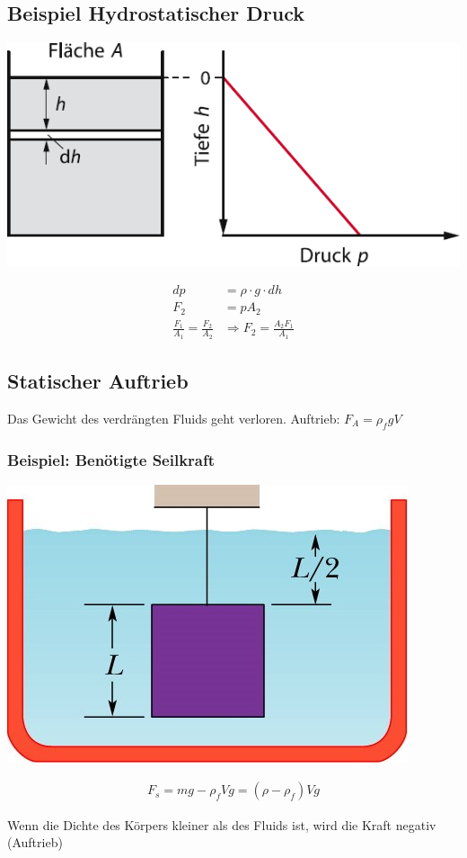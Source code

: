 \documentclass[a4paper]{scrartcl}
\begin{document}
\subsection{Beispiel Hydrostatischer Druck}
	\begin{multicols}{2}
		\includegraphics[width=\linewidth]{img/hydrostatischer_druck}
		
		\begin{align*}
		dp &= \rho \cdot g \cdot dh\\
		F_2 &= p A_2\\
		\frac{F_1}{A_1} = \frac{F_2}{A_2} &\Rightarrow F_2 = \frac{A_2 F_1}{A_1}
		\end{align*}	
	\end{multicols}


\subsection{Statischer Auftrieb}
	Das Gewicht des verdrängten Fluids geht verloren. Auftrieb: $F_A = \rho_f g V$
	
\subsubsection{Beispiel: Benötigte Seilkraft}
	\begin{multicols}{2}
		\includegraphics[width=\linewidth]{img/statischer_auftrieb.jpg}
		
		\begin{align*}
			F_s= mg - \rho_f V g = (\rho - \rho_f) V g
		\end{align*}
		
		Wenn die Dichte des Körpers kleiner als des Fluids ist, wird die Kraft negativ (Auftrieb)
	\end{multicols}
\end{document}
